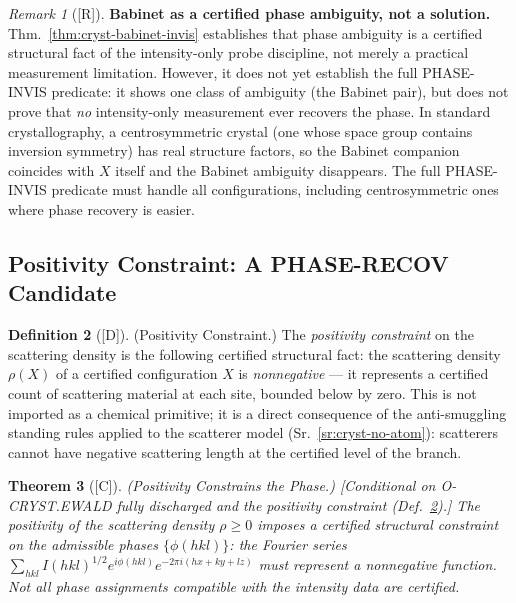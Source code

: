 \documentclass[12pt,oneside]{amsbook}
\theoremstyle{plain}
\newtheorem{theorem}{Theorem}[section]
\theoremstyle{definition}
\newtheorem{definition}[theorem]{Definition}
\theoremstyle{remark}
\newtheorem{remark}[theorem]{Remark}
\newcommand{\status}[1]{\textup{[#1]}}
\begin{document}
\begin{remark}[\status{R}]\label{rem:cryst-babinet-note}
\textbf{Babinet as a certified phase ambiguity, not a solution.}
Thm.~\ref{thm:cryst-babinet-invis} establishes that phase
ambiguity is a certified structural fact of the intensity-only
probe discipline, not merely a practical measurement limitation.
However, it does not yet establish the full PHASE-INVIS
predicate: it shows one class of ambiguity (the Babinet pair),
but does not prove that \emph{no} intensity-only measurement
ever recovers the phase.  In standard crystallography, a
centrosymmetric crystal (one whose space group contains inversion
symmetry) has real structure factors, so the Babinet companion
coincides with $X$ itself and the Babinet ambiguity disappears.
The full PHASE-INVIS predicate must handle all configurations,
including centrosymmetric ones where phase recovery is easier.
\end{remark}

\subsection{Positivity Constraint: A PHASE-RECOV Candidate}

\begin{definition}[\status{D}]\label{def:cryst-positivity-constraint}
\textup{(Positivity Constraint.)}
The \emph{positivity constraint} on the scattering density is
the following certified structural fact: the scattering density
$\rho(X)$ of a certified configuration $X$ is
\emph{nonnegative} --- it represents a certified count of
scattering material at each site, bounded below by zero.
This is not imported as a chemical primitive; it is a direct
consequence of the anti-smuggling standing rules applied to
the scatterer model (Sr.~\ref{sr:cryst-no-atom}): scatterers
cannot have negative scattering length at the certified level
of the branch.
\end{definition}

\begin{theorem}[\status{C}]\label{thm:cryst-positivity-phase}
\textup{(Positivity Constrains the Phase.)}
\textup{[Conditional on O-CRYST.EWALD fully discharged and the
positivity constraint (Def.~\ref{def:cryst-positivity-constraint}).]}
The positivity of the scattering density $\rho \ge 0$ imposes
a certified structural constraint on the admissible phases
$\{\phi(hkl)\}$: the Fourier series
$\sum_{hkl} I(hkl)^{1/2} e^{i\phi(hkl)} e^{-2\pi i(hx+ky+lz)}$
must represent a nonnegative function.  Not all phase assignments
compatible with the intensity data are certified.
\end{theorem}
\end{document}

